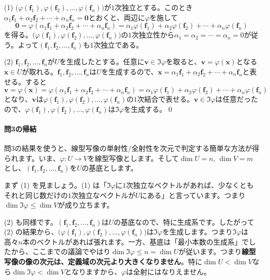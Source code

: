 \noindent (1) $\bigl(\varphi(\bm{f}_1), \varphi(\bm{f}_2), \ldots, \varphi(\bm{f}_n)\bigr)$が$1$次独立とする。このとき$\alpha_1 \bm{f}_1 + \alpha_2 \bm{f}_2 + \cdots + \alpha_n \bm{f}_n = \bm{0}$とおくと、両辺に$\varphi$を施して
\[
\bm{0} = \varphi(\alpha_1 \bm{f}_1 + \alpha_2 \bm{f}_2 + \cdots + \alpha_n \bm{f}_n) = \alpha_1 \varphi(\bm{f}_1) + \alpha_2 \varphi(\bm{f}_2) + \cdots + \alpha_n \varphi(\bm{f}_n)
\]
を得る。$\bigl(\varphi(\bm{f}_1), \varphi(\bm{f}_2), \ldots, \varphi(\bm{f}_n)\bigr)$の$1$次独立性から$\alpha_1 = \alpha_2 = \cdots = \alpha_n = 0$が従う。よって$(\bm{f}_1, \bm{f}_2, \ldots, \bm{f}_n)$も$1$次独立である。

\noindent (2) $\bm{f}_1, \bm{f}_2, \ldots, \bm{f}_n$が$U$を生成したとする。任意に$\bm{v} \in \Im \varphi$を取ると、$\bm{v} = \varphi(\bm{x})$となる$\bm{x} \in U$が取れる。$\bm{f}_1, \bm{f}_2, \ldots, \bm{f}_n$は$U$を生成するので、$\bm{x} = \alpha_1 \bm{f}_1 + \alpha_2 \bm{f}_2 + \cdots + \alpha_n \bm{f}_n$と表せる。すると
\[
\bm{v} = \varphi(\bm{x}) = \varphi(\alpha_1 \bm{f}_1 + \alpha_2 \bm{f}_2 + \cdots + \alpha_n \bm{f}_n)
= \alpha_1 \varphi(\bm{f}_1) + \alpha_2 \varphi(\bm{f}_2) + \cdots + \alpha_n \varphi(\bm{f}_n)
\]
となり、$\bm{v}$は$\varphi(\bm{f}_1), \varphi(\bm{f}_2), \ldots, \varphi(\bm{f}_n)$の$1$次結合で表せる。$\bm{v} \in \Im \varphi$は任意だったので、$\varphi(\bm{f}_1), \varphi(\bm{f}_2), \ldots, \varphi(\bm{f}_n)$は$\Im \varphi$を生成する。\qed

\paragraph{問3の帰結} 問3の結果を使うと、線型写像の単射性/全射性を次元で判定する簡単な方法が得られます。いま、$\varphi\colon U\rightarrow V$を線型写像とします。そして$\dim U = n$, $\dim V= m$とし、$(\bm{f}_1, \bm{f}_2, \ldots, \bm{f}_n)$を$U$の基底とします。

まず (1) を見ましょう。(1) は「$\Im \varphi$に$1$次独立なベクトルがあれば、少なくともそれと同じ数だけの$1$次独立なベクトルが$U$にある」と言っています。つまり$\dim \Im \varphi \leq \dim V$が成り立ちます。 

(2) も同様です。$(\bm{f}_1, \bm{f}_2, \ldots, \bm{f}_n)$は$U$の基底なので、特に生成系です。したがって (2) の結果から、$\bigl(\varphi(\bm{f}_1), \varphi(\bm{f}_2), \ldots, \varphi(\bm{f}_n)\bigr)$は$\Im \varphi$を生成します。つまり$\Im \varphi$は高々$n$本のベクトルがあれば張れます。一方、基底は「最小本数の生成系」でしたから、ここまでの議論でやはり$\dim \Im \varphi \leq n = \dim U$が従います。つまり\textbf{線型写像の像の次元は、定義域の次元より大きくなりません}。特に$\dim U < \dim V$なら$\dim \Im \varphi < \dim V$となりますから、$\varphi$は全射にはなりえません。

